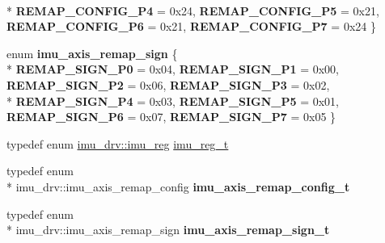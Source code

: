 \begin{DoxyCompactItemize}
\\*
{\bfseries R\-E\-M\-A\-P\-\_\-\-C\-O\-N\-F\-I\-G\-\_\-\-P4} = 0x24, 
{\bfseries R\-E\-M\-A\-P\-\_\-\-C\-O\-N\-F\-I\-G\-\_\-\-P5} = 0x21, 
{\bfseries R\-E\-M\-A\-P\-\_\-\-C\-O\-N\-F\-I\-G\-\_\-\-P6} = 0x21, 
{\bfseries R\-E\-M\-A\-P\-\_\-\-C\-O\-N\-F\-I\-G\-\_\-\-P7} = 0x24
 \}
\item 
enum {\bfseries imu\-\_\-axis\-\_\-remap\-\_\-sign} \{ \\*
{\bfseries R\-E\-M\-A\-P\-\_\-\-S\-I\-G\-N\-\_\-\-P0} = 0x04, 
{\bfseries R\-E\-M\-A\-P\-\_\-\-S\-I\-G\-N\-\_\-\-P1} = 0x00, 
{\bfseries R\-E\-M\-A\-P\-\_\-\-S\-I\-G\-N\-\_\-\-P2} = 0x06, 
{\bfseries R\-E\-M\-A\-P\-\_\-\-S\-I\-G\-N\-\_\-\-P3} = 0x02, 
\\*
{\bfseries R\-E\-M\-A\-P\-\_\-\-S\-I\-G\-N\-\_\-\-P4} = 0x03, 
{\bfseries R\-E\-M\-A\-P\-\_\-\-S\-I\-G\-N\-\_\-\-P5} = 0x01, 
{\bfseries R\-E\-M\-A\-P\-\_\-\-S\-I\-G\-N\-\_\-\-P6} = 0x07, 
{\bfseries R\-E\-M\-A\-P\-\_\-\-S\-I\-G\-N\-\_\-\-P7} = 0x05
 \}
\item 
typedef enum \hyperlink{classimu__drv_ae3b2e2b681ec835e7686c7b333a53cb9}{imu\-\_\-drv\-::imu\-\_\-reg} \hyperlink{classimu__drv_a5af10b56ac161eafe231540cbc22f680}{imu\-\_\-reg\-\_\-t}
\item 
\hypertarget{classimu__drv_ad04cf1aae57aa9c2e18f43143b691d45}{typedef enum \\*
imu\-\_\-drv\-::imu\-\_\-axis\-\_\-remap\-\_\-config {\bfseries imu\-\_\-axis\-\_\-remap\-\_\-config\-\_\-t}}\label{classimu__drv_ad04cf1aae57aa9c2e18f43143b691d45}

\item 
\hypertarget{classimu__drv_a8d8b3c2cd085ef728c6b7da27d04b6d3}{typedef enum \\*
imu\-\_\-drv\-::imu\-\_\-axis\-\_\-remap\-\_\-sign {\bfseries imu\-\_\-axis\-\_\-remap\-\_\-sign\-\_\-t}}\label{classimu__drv_a8d8b3c2cd085ef728c6b7da27d04b6d3}

\end{DoxyCompactItemize}
